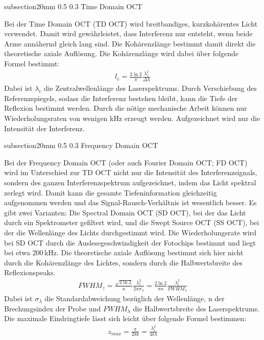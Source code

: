 \documentclass[german, %
parskip=full, %
bibliography=totoc, %
]{scrartcl}
\makeatletter
\renewcommand\subsection{\@startsection 
   {subsection}{2}{0mm}%
   {0.5\baselineskip}%
   {0.3\baselineskip}%
   {\bfseries\sffamily\large}%
   }
\makeatother
\begin{document}
\subsection{Time Domain OCT}

Bei der Time Domain OCT (TD OCT) wird breitbandiges, kurzkohärentes Licht verwendet. Damit wird gewährleistet, dass Interferenz nur entsteht, wenn beide Arme annähernd gleich lang sind. Die Kohärenzlänge bestimmt damit direkt die theoretische axiale Auflösung. Die Kohärenzlänge wird dabei über folgende Formel bestimmt:
\begin{align}
l_c = \frac{2 \ln 2}{\pi} \frac{\lambda_c^2}{\Delta \lambda} 
\end{align}
Dabei ist $\lambda_c$ die Zentralwellenlänge des Laserspektrums.
Durch Verschiebung des Referenzspiegels, sodass die Interferenz bestehen bleibt, kann die Tiefe der Reflexion bestimmt werden. Durch die nötige mechanische Arbeit können nur Wiederholungsraten von wenigen kHz erzeugt werden. Aufgezeichnet wird nur die Intensität der Interferenz.

\subsection{Frequency Domain OCT}

Bei der Frequency Domain OCT (oder auch Fourier Domain OCT; FD OCT) wird im Unterschied zur TD OCT nicht nur die Intensität des Interferenzsignals, sondern des ganzen Interferenzspektrum aufgezeichnet, indem das Licht spektral zerlegt wird. Damit kann die gesamte Tiefeninformation gleichzeitig aufgenommen werden und das Signal-Rausch-Verhältnis ist wesentlich besser. Es gibt zwei Varianten: Die Spectral Domain OCT (SD OCT), bei der das Licht durch ein Spektrometer gefiltert wird, und die Swept Source OCT (SS OCT), bei der die Wellenlänge des Lichts durchgestimmt wird. Die Wiederholungsrate wird bei SD OCT durch die Auslesegeschwindigkeit der Fotochips bestimmt und liegt bei etwa 200\,kHz. Die theoretische axiale Auflösung bestimmt sich hier nicht durch die Kohärenzlänge des Lichtes, sondern durch die Halbwertsbreite des Reflexionspeaks. 
\begin{align}
FWHM_z = \frac{\sqrt{2 \ln 2}}{n}\frac{\lambda_c^2}{2 \pi \sigma_\lambda} = \frac{2 \ln 2}{\pi n}\frac{\lambda_c^2}{FWHM_\lambda} 
\end{align}
Dabei ist $\sigma_\lambda$ die Standardabweichung bezüglich der Wellenlänge, n der Brechungsindex der Probe und $FWHM_{\lambda}$ die Halbwertsbreite des Laserspektrums. Die maximale Eindringtiefe lässt sich leicht über folgende Formel bestimmen: 
\begin{align}
z_{max} = \frac{\pi}{2 \delta k} = \frac{\lambda_c^2}{4 \delta \lambda}
\end{align}
\end{document}
